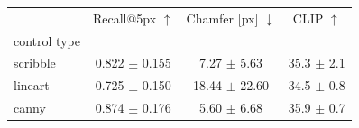 \begin{tabular}{lccc}
\toprule
 & Recall@5px $\uparrow$ & Chamfer [px] $\downarrow$ & CLIP $\uparrow$ \\
control type &  &  &  \\
\midrule
scribble & 0.822 $\pm$ 0.155 & 7.27 $\pm$ 5.63 & 35.3 $\pm$ 2.1 \\
lineart & 0.725 $\pm$ 0.150 & 18.44 $\pm$ 22.60 & 34.5 $\pm$ 0.8 \\
canny & 0.874 $\pm$ 0.176 & 5.60 $\pm$ 6.68 & 35.9 $\pm$ 0.7 \\
\bottomrule
\end{tabular}

